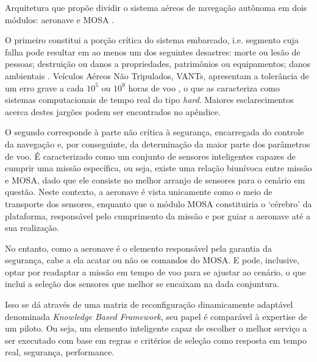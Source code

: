 Arquitetura que propõe dividir o sistema aéreos de navegação autônoma em dois módulos: aeronave e MOSA \cite{mosa_proposal}.

O primeiro constitui a porção crítica do sistema embarcado, i.e. segmento cuja falha pode resultar em ao menos um dos seguintes desastres: morte 
ou lesão de pessoas; destruição ou danos a propriedades, patrimônios ou equipamentos; danos ambientais \cite{safety}.
Veículos Aéreos Não Tripulados, VANTs, apresentam a tolerância de um erro grave a cada $10^5$ ou $10^9$ horas de voo \cite{hard}, o que as 
caracteriza 
como sistemas computacionais de tempo real do tipo \textit{hard}. 
Maiores esclarecimentos acerca destes jargões podem ser encontrados no apêndice.

O segundo corresponde à parte não crítica à segurança, encarregada do controle da navegação e, por conseguinte, da determinação da maior parte dos 
parâmetros de voo. É caracterizado como um conjunto de sensores inteligentes capazes de cumprir uma missão específica, ou seja, 
existe uma relação biunívoca entre missão e MOSA, dado que ele consiste no melhor arranjo de sensores para o cenário em questão. Neste contexto, a 
aeronave é vista unicamente como o meio de transporte dos sensores, enquanto que o módulo MOSA constituiria o \textquoteleft cérebro\textquoteright{}  
da plataforma, responsável pelo cumprimento da missão e por guiar a aeronave até a sua realização.


No entanto, como a aeronave é o elemento responsável pela garantia da segurança, cabe a ela acatar ou não os comandos do MOSA. E pode, inclusive, 
optar por readaptar a missão em tempo de voo para se ajustar ao cenário, o que inclui a seleção dos sensores que melhor se encaixam na dada 
conjuntura.

Isso se dá através de uma matriz de reconfiguração dinamicamente adaptável denominada \textit{Knowledge Based Framework}, seu papel é comparável à 
expertise de um piloto.
Ou seja, um elemento inteligente capaz de escolher o melhor serviço  a ser executado com base em regras e critérios de seleção como resposta em tempo 
real, segurança, performance.


